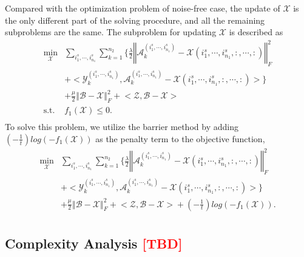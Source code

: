 \documentclass[12pt, draftcls, onecolumn]{IEEEtran}
\theoremstyle{plain}
\theoremstyle{definition}
\theoremstyle{remark}
\newcommand{\nt}[1]{\textcolor{red}{\textbf{[#1]}}}
\begin{document}
Compared with the optimization problem of noise-free case, the update of $\mathcal{X}$ is the only different part of the solving procedure, and all the remaining subproblems are the same.
The subproblem for updating $\mathcal{X}$ is described as 
\begin{equation*}
\begin{aligned}
\min_{\mathcal{X}}
&\sum_{i^s_{1},\cdots,i^s_{n_1}}\sum_{k=1}^{n_2}\Bigg\{\frac{\lambda}{2}\left\Vert\mathcal{A}^{(i^s_{1},\cdots,i^s_{n_1})}_k-\mathcal{X}(i^s_{1},\cdots,i^s_{n_1},:,\cdots,:)\right\Vert_F^2\\
&+\bigg<\mathcal{Y}^{(i^s_{1},\cdots,i^s_{n_1})}_k,\mathcal{A}^{(i^s_{1},\cdots,i^s_{n_1})}_k-\mathcal{X}(i^s_{1},\cdots,i^s_{n_1},:,\cdots,:)\bigg>\Bigg\}\\
&+\frac{\mu}{2}\left\Vert\mathcal{B}-\mathcal{X}\right\Vert_F^2+\big<\mathcal{Z},\mathcal{B}-\mathcal{X}\big>\\
\text{s.t.}\ & f_1(\mathcal{X}) \leq 0.\\
\end{aligned}
\end{equation*}
To solve this problem, we utilize the barrier method by adding $\left(-\frac{1}{t}\right)log (-f_1(\mathcal{X}))$ as the penalty term to the objective function,
\begin{equation*}
\begin{aligned}
\min_{\mathcal{X}}
&\sum_{i^s_{1},\cdots,i^s_{n_1}}\sum_{k=1}^{n_2}\Bigg\{\frac{\lambda}{2}\left\Vert\mathcal{A}^{(i^s_{1},\cdots,i^s_{n_1})}_k-\mathcal{X}(i^s_{1},\cdots,i^s_{n_1},:,\cdots,:)\right\Vert_F^2\\
&+\bigg<\mathcal{Y}^{(i^s_{1},\cdots,i^s_{n_1})}_k,\mathcal{A}^{(i^s_{1},\cdots,i^s_{n_1})}_k-\mathcal{X}(i^s_{1},\cdots,i^s_{n_1},:,\cdots,:)\bigg>\Bigg\}\\
&+\frac{\mu}{2}\left\Vert\mathcal{B}-\mathcal{X}\right\Vert_F^2+\big<\mathcal{Z},\mathcal{B}-\mathcal{X}\big>+\left(-\frac{1}{t}\right)log (-f_1(\mathcal{X})).\\
\end{aligned}
\end{equation*}

\subsection{Complexity Analysis \nt{TBD}}
\end{document}
